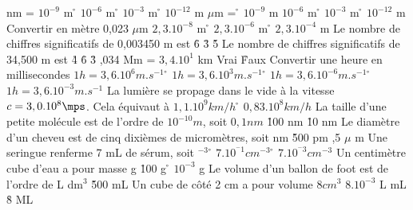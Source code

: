  nm =
\rv
$10^{-9}$ m
\r
$10^{-6}$ m
\r
$10^{-3}$ m
\r
$10^{-12}$ m
 $\mu$m =
\r
$10^{-9}$ m
\rv
$10^{-6}$ m
\r
$10^{-3}$ m
\r
$10^{-12}$ m
\q
Convertir en mètre 0,023 $\mu$m
\rv
$2,3. 10^{-8}$ m
\r
$2,3. 10^{-6}$ m
\r
$2,3. 10^{-4}$ m
\q
Le nombre de chiffres significatifs de 0,003450 m est
\r
6
\r
3
\r
5
\q
Le nombre de chiffres significatifs de 34,500 m est
\r
4
\r
6
\r
3
,034 Mm = $3,4.10^1$ km
\rv
Vrai
\r
Faux
\q
Convertir une heure en millisecondes
\rv
$1 h = 3,6.10^6 m.s^{-1}$
\r
$1 h = 3,6.10^3 m.s^{-1}$
\r
$1 h = 3,6.10^{-6} m.s^{-1}$
\r
$1 h = 3,6.10^{-3} m.s^{-1}$
\q
La lumière se propage dans le vide à  la vitesse $c=3,0.10^8\mps$.
Cela équivaut à  
\rv
$1,1.10^9 km/h$
\r
$0,83.10^8 km/h$
\q
La taille d'une petite molécule	est de l'ordre de $10^{-10} m$, soit
\rv
$0,1 nm$
\r
100 nm
\r
10 nm	
\q
Le diamètre d'un cheveu	est de cinq dixièmes de micromètres, soit
 nm
\r
500 pm
,5 $\mu$ m
\q 
Une seringue renferme 7 mL de sérum, soit
 $^{-3}$
\r
$7.10^{^-1}cm^{-3}$
\r
$7.10^{^-3}cm^{-3}$
\q
Un centimètre cube d'eau a pour masse
 g
\r
100 g
\r
$10^{-3}$ g
\q
Le volume d'un ballon de foot est de l'ordre de 
 L
 dm$^{3}$
\r
500 mL
\q
Un cube de côté 2 cm a pour volume
\rv
$8 cm^{3}$
\rv
$8.10^{-3}$ L 
 mL
\r
8 ML
